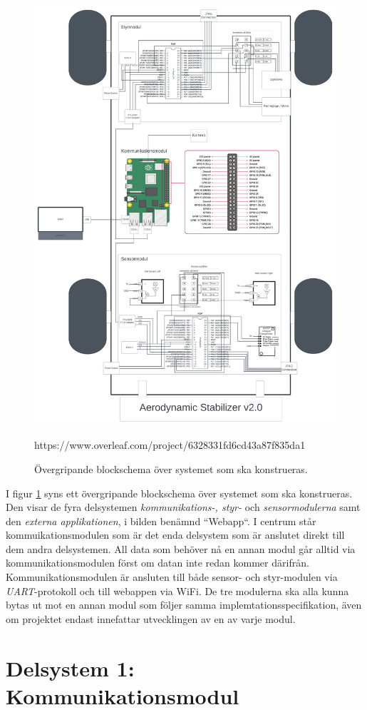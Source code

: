 \documentclass[10pt,oneside,swedish]{lips}
\begin{document}
\begin{figure}[htbp]
  \centering
  \includegraphics[width=.6\textwidth]{./Figures/detalj_oversikt.png}
  \caption{Övergripande blockschema över systemet som ska konstrueras.}https://www.overleaf.com/project/6328331fd6cd43a87f835da1
  \label{fig:detalj_oversikt}
\end{figure}
\clearpage

I figur \ref{fig:detalj_oversikt} syns ett övergripande blockschema över systemet som ska konstrueras. Den visar de fyra delsystemen \emph{kommunikations-, styr-} och \emph{sensormodulerna} samt den \emph{externa applikationen}, i bilden benämnd ``Webapp``. I centrum står kommuikationsmodulen som är det enda delsystem som är anslutet direkt till dem andra delsystemen. All data som behöver nå en annan modul går alltid via kommunikationsmodulen först om datan inte redan kommer därifrån.
Kommunikationsmodulen är ansluten till både sensor- och styr-modulen via \emph{UART}-protokoll och till webappen via WiFi. De tre modulerna ska alla kunna bytas ut mot en annan modul som följer samma implemtationsspecifikation, även om projektet endast innefattar utvecklingen av en av varje modul. 


\section{Delsystem 1: Kommunikationsmodul}
\end{document}
